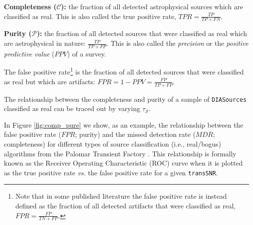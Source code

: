 {\bf Completeness ($\mathcal{C}$):} the fraction of all detected astrophysical sources which are classified as real. This is also called the true positive rate, $\mathit{TPR} = \frac{\mathit{TP}}{\mathit{TP}+\mathit{FN}}$.

{\bf Purity ($\mathcal{P}$):} the fraction of all detected sources that were classified as real which are astrophysical in nature: $\frac{\mathit{TP}}{\mathit{TP}+\mathit{FP}}$. This is also called the {\it precision} or the {\it positive predictive value} ($\mathit{PPV}$) of a survey. 

The false positive rate\footnote{Note that in some published literature the false positive rate is instead defined as the fraction of all detected artifacts that were classified as real, $\mathit{FPR} = \frac{\mathit{FP}}{\mathit{TN}+\mathit{FP}}$.} is the fraction of all detected sources that were classified as real but which are artifacts: $\mathit{FPR} = 1 - \mathit{PPV} = \frac{\mathit{FP}}{\mathit{TP}+\mathit{FP}}$.

The relationship between the completeness and purity of a sample of {\tt DIASources} classified as real can be traced out by varying $\tau_{\mathcal{S}}$.

In Figure \ref{fig:comp_pure} we show, as an example, the relationship between the false positive rate ($\mathit{FPR}$; purity) and the missed detection rate ($\mathit{MDR}$; completeness) for different types of source classification (i.e., real/bogus) algorithms from the Palomar Transient Factory \citep[PTF;][]{2013MNRAS.435.1047B}.
This relationship is formally known as the Receiver Operating Characteristic (ROC) curve when it is plotted as the true positive rate {\it vs.} the false positive rate for a given {\tt transSNR}.

